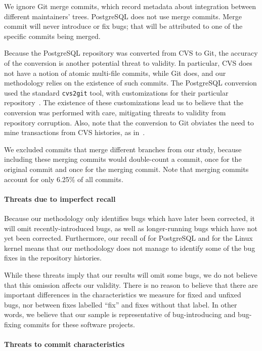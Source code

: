 We ignore Git merge commits, which record metadata about integration between
different maintainers' trees. PostgreSQL does not use merge commits. Merge
commit will never introduce or fix bugs; that will be attributed to one of the
specific commits being merged.

Because the PostgreSQL repository was converted from CVS to Git, the accuracy of
the conversion is another potential threat to validity. In particular, CVS does
not have a notion of atomic multi-file commits, while Git does, and our
methodology relies on the existence of such commits. The PostgreSQL conversion
used the standard {\tt cvs2git} tool, with customizations for their particular
repository~\cite{haas09:_so_why_postg_using_git}. The existence of these
customizations lead us to believe
that the conversion was performed with care, mitigating threats to
validity from repository corruption. Also, note that the conversion to Git
obviates the need to mine transactions from CVS histories, as
in~\cite{zimmermann-msr-2004}.

We excluded commits that merge different branches from our study, because
including these merging commits would double-count a commit, once for the
original commit and once for the merging commit. Note that merging
commits account for only 6.25\% of all commits.

\paragraph{Threats due to imperfect recall}

Because our methodology only identifies bugs which have later been corrected, it
will omit recently-introduced bugs, as well as longer-running bugs
which have not yet been corrected. Furthermore, our recall of \postR for
PostgreSQL and \linuxR for the Linux kernel means that our methodology does not
manage to identify some of the bug fixes in the repository histories.

While these threats imply that our results will omit some bugs, we do not
believe that this omission affects our validity. There is no reason to believe
that there are important differences in the characteristics we measure for fixed
and unfixed bugs, nor between fixes labelled ``fix'' and fixes without that
label. In other words, we believe that our sample is representative of
bug-introducing and bug-fixing commits for these software projects.

\paragraph{Threats to commit characteristics}

